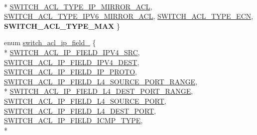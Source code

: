 \begin{DoxyCompactItemize}
\\*
\hyperlink{group__ACL_gga38651cb44573d362748840ec5c930d5aa37e75b002074e7f424dee9c932c4038f}{S\+W\+I\+T\+C\+H\+\_\+\+A\+C\+L\+\_\+\+T\+Y\+P\+E\+\_\+\+I\+P\+\_\+\+M\+I\+R\+R\+O\+R\+\_\+\+A\+C\+L}, 
\hyperlink{group__ACL_gga38651cb44573d362748840ec5c930d5aa83d541641017fd26480166d6f87a4ba7}{S\+W\+I\+T\+C\+H\+\_\+\+A\+C\+L\+\_\+\+T\+Y\+P\+E\+\_\+\+I\+P\+V6\+\_\+\+M\+I\+R\+R\+O\+R\+\_\+\+A\+C\+L}, 
\hyperlink{group__ACL_gga38651cb44573d362748840ec5c930d5aa922ce90806fa18813d10468300b51c27}{S\+W\+I\+T\+C\+H\+\_\+\+A\+C\+L\+\_\+\+T\+Y\+P\+E\+\_\+\+E\+C\+N}, 
{\bfseries S\+W\+I\+T\+C\+H\+\_\+\+A\+C\+L\+\_\+\+T\+Y\+P\+E\+\_\+\+M\+A\+X}
 \}
\item 
enum \hyperlink{group__ACL_gace4560f87e18ccd1d8f9119fe7900fa1}{switch\+\_\+acl\+\_\+ip\+\_\+field\+\_\+} \{ \\*
\hyperlink{group__ACL_ggace4560f87e18ccd1d8f9119fe7900fa1aab6ec5bbe626eb8c54c092be57d5c8ec}{S\+W\+I\+T\+C\+H\+\_\+\+A\+C\+L\+\_\+\+I\+P\+\_\+\+F\+I\+E\+L\+D\+\_\+\+I\+P\+V4\+\_\+\+S\+R\+C}, 
\hyperlink{group__ACL_ggace4560f87e18ccd1d8f9119fe7900fa1ac0808f67655c397b799e2e48dcda7570}{S\+W\+I\+T\+C\+H\+\_\+\+A\+C\+L\+\_\+\+I\+P\+\_\+\+F\+I\+E\+L\+D\+\_\+\+I\+P\+V4\+\_\+\+D\+E\+S\+T}, 
\hyperlink{group__ACL_ggace4560f87e18ccd1d8f9119fe7900fa1a1c9d3729d3eac26918e5c70cff172030}{S\+W\+I\+T\+C\+H\+\_\+\+A\+C\+L\+\_\+\+I\+P\+\_\+\+F\+I\+E\+L\+D\+\_\+\+I\+P\+\_\+\+P\+R\+O\+T\+O}, 
\hyperlink{group__ACL_ggace4560f87e18ccd1d8f9119fe7900fa1a420ea9c1b0b5f0d9055cedae684414a8}{S\+W\+I\+T\+C\+H\+\_\+\+A\+C\+L\+\_\+\+I\+P\+\_\+\+F\+I\+E\+L\+D\+\_\+\+L4\+\_\+\+S\+O\+U\+R\+C\+E\+\_\+\+P\+O\+R\+T\+\_\+\+R\+A\+N\+G\+E}, 
\\*
\hyperlink{group__ACL_ggace4560f87e18ccd1d8f9119fe7900fa1aede6cdeecd8d46ba0e6901f6ad5cbfe2}{S\+W\+I\+T\+C\+H\+\_\+\+A\+C\+L\+\_\+\+I\+P\+\_\+\+F\+I\+E\+L\+D\+\_\+\+L4\+\_\+\+D\+E\+S\+T\+\_\+\+P\+O\+R\+T\+\_\+\+R\+A\+N\+G\+E}, 
\hyperlink{group__ACL_ggace4560f87e18ccd1d8f9119fe7900fa1a1302bc7be80c8785ecf9ea4de6ad6104}{S\+W\+I\+T\+C\+H\+\_\+\+A\+C\+L\+\_\+\+I\+P\+\_\+\+F\+I\+E\+L\+D\+\_\+\+L4\+\_\+\+S\+O\+U\+R\+C\+E\+\_\+\+P\+O\+R\+T}, 
\hyperlink{group__ACL_ggace4560f87e18ccd1d8f9119fe7900fa1aab5b01a916b3b2e95ed23a0e88dabb59}{S\+W\+I\+T\+C\+H\+\_\+\+A\+C\+L\+\_\+\+I\+P\+\_\+\+F\+I\+E\+L\+D\+\_\+\+L4\+\_\+\+D\+E\+S\+T\+\_\+\+P\+O\+R\+T}, 
\hyperlink{group__ACL_ggace4560f87e18ccd1d8f9119fe7900fa1a6af93336ed51691722cf370be038b0d2}{S\+W\+I\+T\+C\+H\+\_\+\+A\+C\+L\+\_\+\+I\+P\+\_\+\+F\+I\+E\+L\+D\+\_\+\+I\+C\+M\+P\+\_\+\+T\+Y\+P\+E}, 
\\*

\end{DoxyCompactItemize}
